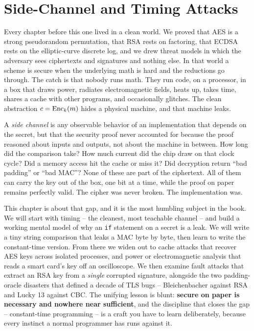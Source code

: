 \chapter{Side-Channel and Timing Attacks}

Every chapter before this one lived in a clean world. We proved that AES is a strong pseudorandom permutation, that RSA rests on factoring, that ECDSA rests on the elliptic-curve discrete log, and we drew threat models in which the adversary sees ciphertexts and signatures and nothing else. In that world a scheme is secure when the underlying math is hard and the reductions go through. The catch is that nobody runs math. They run code, on a processor, in a box that draws power, radiates electromagnetic fields, heats up, takes time, shares a cache with other programs, and occasionally glitches. The clean abstraction $c = \operatorname{Enc}_k(m)$ hides a physical machine, and that machine leaks.

A \emph{side channel} is any observable behavior of an implementation that depends on the secret, but that the security proof never accounted for because the proof reasoned about inputs and outputs, not about the machine in between. How long did the comparison take? How much current did the chip draw on that clock cycle? Did a memory access hit the cache or miss it? Did decryption return ``bad padding'' or ``bad MAC''? None of these are part of the ciphertext. All of them can carry the key out of the box, one bit at a time, while the proof on paper remains perfectly valid. The cipher was never broken. The implementation was.

This chapter is about that gap, and it is the most humbling subject in the book. We will start with timing -- the cleanest, most teachable channel -- and build a working mental model of why an \texttt{if} statement on a secret is a leak. We will write a tiny string comparison that leaks a MAC byte by byte, then learn to write the constant-time version. From there we widen out to cache attacks that recover AES keys across isolated processes, and power or electromagnetic analysis that reads a smart card's key off an oscilloscope. We then examine fault attacks that extract an RSA key from a \emph{single} corrupted signature, alongside the two padding-oracle disasters that defined a decade of TLS bugs -- Bleichenbacher against RSA and Lucky 13 against CBC. The unifying lesson is blunt: \textbf{secure on paper is necessary and nowhere near sufficient}, and the discipline that closes the gap -- constant-time programming -- is a craft you have to learn deliberately, because every instinct a normal programmer has runs against it.

